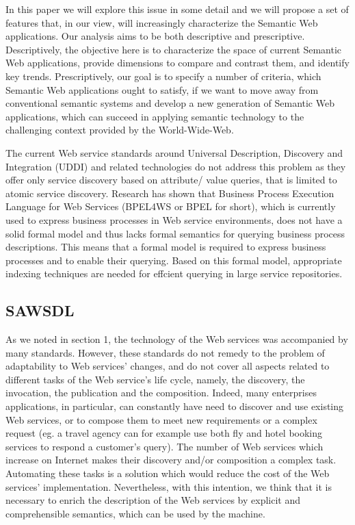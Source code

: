 
In this paper we will explore this issue in some detail and we will propose a set of
features that, in our view, will increasingly characterize the Semantic Web
applications. Our analysis aims to be both descriptive and prescriptive. Descriptively,
the objective here is to characterize the space of current Semantic Web applications,
provide dimensions to compare and contrast them, and identify key trends.
Prescriptively, our goal is to specify a number of criteria, which Semantic Web
applications ought to satisfy, if we want to move away from conventional semantic
systems and develop a new generation of Semantic Web applications, which can
succeed in applying semantic technology to the challenging context provided by the
World-Wide-Web. \cite{ngswa}

The current Web service standards around Universal
Description, Discovery and Integration (UDDI) and related technologies do not address this
problem as they offer only service discovery based on attribute/ value queries, that is limited
to atomic service discovery. Research has shown that Business Process Execution Language
for Web Services (BPEL4WS or BPEL for short), which is currently used to express business
processes in Web service environments, does not have a solid formal model and thus lacks
formal semantics for querying business process descriptions. This means that a formal model is
required to express business processes and to enable their querying. Based on this formal model,
appropriate indexing techniques are needed for effcient querying in large service repositories. \cite{mothesis}

\subsection{SAWSDL}

As we noted in section 1, the technology of the Web
services was accompanied by many standards. However,
these standards do not remedy to the problem of adaptability
to Web services’ changes, and do not cover all aspects related
to different tasks of the Web service’s life cycle, namely, the
discovery, the invocation, the publication and the
composition. Indeed, many enterprises applications, in
particular, can constantly have need to discover and use
existing Web services, or to compose them to meet new
requirements or a complex request (eg. a travel agency can
for example use both fly and hotel booking services to
respond a customer’s query). The number of Web services
which increase on Internet makes their discovery and/or
composition a complex task. Automating these tasks is a
solution which would reduce the cost of the Web services’
implementation. Nevertheless, with this intention, we think
that it is necessary to enrich the description of the Web
services by explicit and comprehensible semantics, which can
be used by the machine. \cite{ei-sawsdl}

